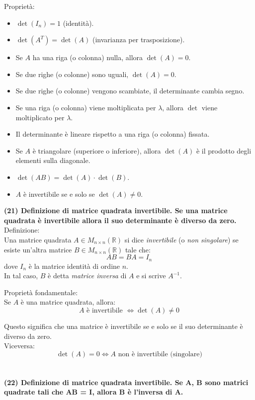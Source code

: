 \documentclass[10pt]{extarticle}
\begin{document}
Proprietà:
\begin{itemize}
    \item $\det(I_n) = 1$ (identità).
    \item $\det(A^T) = \det(A)$ (invarianza per trasposizione).
    \item Se $A$ ha una riga (o colonna) nulla, allora $\det(A) = 0$.
    \item Se due righe (o colonne) sono uguali, $\det(A) = 0$.
    \item Se due righe (o colonne) vengono scambiate, il determinante cambia segno.
    \item Se una riga (o colonna) viene moltiplicata per $\lambda$, allora $\det$ viene moltiplicato per $\lambda$.
    \item Il determinante è lineare rispetto a una riga (o colonna) fissata.
    \item Se $A$ è triangolare (superiore o inferiore), allora $\det(A)$ è il prodotto degli elementi sulla diagonale.
    \item $\det(AB) = \det(A)\cdot\det(B)$.
    \item $A$ è invertibile se e solo se $\det(A) \ne 0$.
\end{itemize}
\textbf{(21) Definizione di matrice quadrata invertibile. Se una matrice quadrata è invertibile allora il suo determinante è diverso da zero.}\\

Definizione:\\
Una matrice quadrata $A \in M_{n \times n}(\mathbb{R})$ si dice \textit{invertibile} (o \textit{non singolare}) se esiste un’altra matrice $B \in M_{n \times n}(\mathbb{R})$ tale che:
\[
AB = BA = I_n
\]
dove $I_n$ è la matrice identità di ordine $n$.\\
In tal caso, $B$ è detta \textit{matrice inversa} di $A$ e si scrive $A^{-1}$.

Proprietà fondamentale:\\
Se $A$ è una matrice quadrata, allora:
\[
A \text{ è invertibile } \iff \det(A) \ne 0
\]

Questo significa che una matrice è invertibile se e solo se il suo determinante è diverso da zero.\\

Viceversa:
\[
\det(A) = 0 \iff A \text{ non è invertibile (singolare)}
\] \\
\vspace{1em}\\
\textbf{(22) Definizione di matrice quadrata invertibile. Se A, B sono matrici quadrate tali che AB = I, allora B è l’inversa di A.}\\
\end{document}
